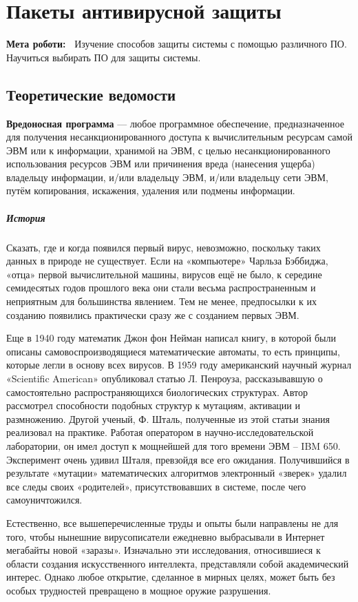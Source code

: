 \chapter{Пакеты антивирусной защиты} \label{chapt6}%
\textbf{Мета роботи:~}%
Изучение способов защиты системы с помощью различного ПО. Научиться выбирать
ПО для защиты системы.
\section{Теоретические ведомости} \label{sect6_a}

\textbf{Вредоносная программа }--- любое программное обеспечение,
предназначенное для получения несанкционированного доступа к вычислительным
ресурсам самой ЭВМ или к информации, хранимой на ЭВМ, с целью
несанкционированного использования ресурсов ЭВМ или причинения вреда
(нанесения ущерба) владельцу информации, и/или владельцу ЭВМ, и/или владельцу
сети ЭВМ, путём копирования, искажения, удаления или подмены информации.
\paragraph{История}
Сказать, где и когда появился первый вирус, невозможно, поскольку таких
данных в природе не существует. Если на «компьютере» Чарльза Бэббиджа, «отца»
первой вычислительной машины, вирусов ещё не было, к середине семидесятых
годов прошлого века они стали весьма распространенным и неприятным для
большинства явлением. Тем не менее, предпосылки к их созданию появились
практически сразу же с созданием первых ЭВМ.

Еще в 1940 году математик Джон фон Нейман написал книгу, в которой были
описаны самовоспроизводящиеся математические автоматы, то есть принципы,
которые легли в основу всех вирусов. В 1959 году американский научный журнал
«Scientific American» опубликовал статью Л. Пенроуза, рассказывавшую о
самостоятельно распространяющихся биологических структурах. Автор рассмотрел
способности подобных структур к мутациям, активации и размножению. Другой
ученый, Ф. Шталь, полученные из этой статьи знания реализовал на практике.
Работая оператором в научно-исследовательской лаборатории, он имел доступ к
мощнейшей для того времени ЭВМ – IBM 650. Эксперимент очень удивил Шталя,
превзойдя все его ожидания. Получившийся в результате «мутации»
математических алгоритмов электронный «зверек» удалил все следы своих
«родителей», присутствовавших в системе, после чего самоуничтожился.

Естественно, все вышеперечисленные труды и опыты были направлены не для того,
чтобы нынешние вирусописатели ежедневно выбрасывали в Интернет мегабайты
новой «заразы». Изначально эти исследования, относившиеся к области создания
искусственного интеллекта, представляли собой академический интерес. Однако
любое открытие, сделанное в мирных целях, может быть без особых трудностей
превращено в мощное оружие разрушения.

